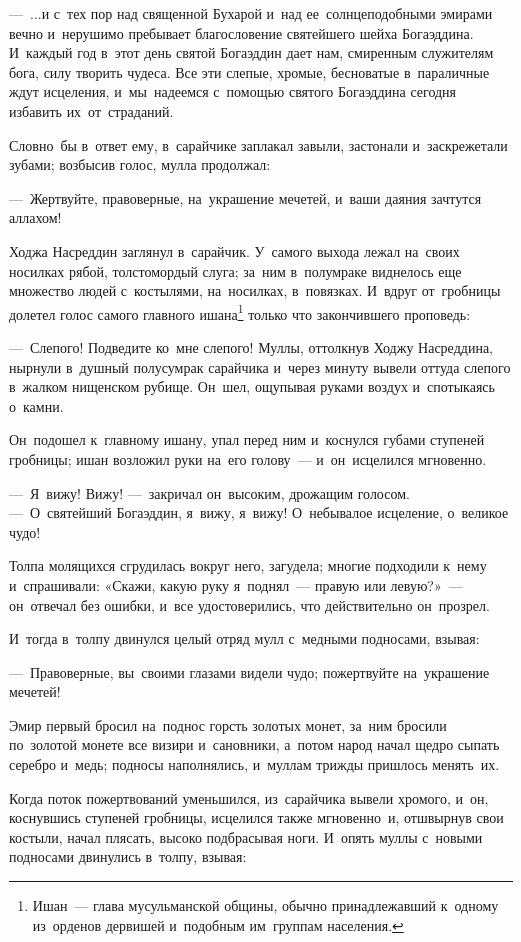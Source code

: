 \documentclass[12pt,a4paper]{book}
\begin{document}
—~...и с~тех пор над священной Бухарой и~над ее~солнцеподобными эмирами вечно и~нерушимо пребывает благословение святейшего шейха Богаэддина. И~каждый год в~этот день святой Богаэддин дает нам, смиренным служителям бога, силу творить чудеса. Все эти слепые, хромые, бесноватые в~параличные ждут исцеления, и~мы~надеемся с~помощью святого Богаэддина сегодня избавить их~от~страданий.

Словно~бы в~ответ ему, в~сарайчике заплакал завыли, застонали и~заскрежетали зубами; возбысив голос, мулла продолжал:

—~Жертвуйте, правоверные, на~украшение мечетей, и~ваши даяния зачтутся аллахом!

Ходжа Насреддин заглянул в~сарайчик. У~самого выхода лежал на~своих носилках рябой, толстомордый слуга; за~ним в~полумраке виднелось еще множество людей с~костылями, на~носилках, в~повязках. И~вдруг от~гробницы долетел голос самого главного ишана\footnote{Ишан~— глава мусульманской общины, обычно принадлежавший к~одному из~орденов дервишей и~подобным им~группам населения.} только что закончившего проповедь:

—~Слепого! Подведите ко~мне слепого! Муллы, оттолкнув Ходжу Насреддина, нырнули в~душный полусумрак сарайчика и~через минуту вывели оттуда слепого в~жалком нищенском рубище. Он~шел, ощупывая руками воздух и~спотыкаясь о~камни.

Он~подошел к~главному ишану, упал перед ним и~коснулся губами ступеней гробницы; ишан возложил руки на~его голову~— и~он~исцелился мгновенно.

—~Я~вижу! Вижу! —~закричал он~высоким, дрожащим голосом. —~О~святейший Богаэддин, я~вижу, я~вижу! О~небывалое исцеление, о~великое чудо!

Толпа молящихся сгрудилась вокруг него, загудела; многие подходили к~нему и~спрашивали: «Скажи, какую руку я~поднял~— правую или левую?»~— он~отвечал без ошибки, и~все удостоверились, что действительно он~прозрел.

И~тогда в~толпу двинулся целый отряд мулл с~медными подносами, взывая:

—~Правоверные, вы~своими глазами видели чудо; пожертвуйте на~украшение мечетей!

Эмир первый бросил на~поднос горсть золотых монет, за~ним бросили по~золотой монете все визири и~сановники, а~потом народ начал щедро сыпать серебро и~медь; подносы наполнялись, и~муллам трижды пришлось менять~их.

Когда поток пожертвований уменьшился, из~сарайчика вывели хромого, и~он, коснувшись ступеней гробницы, исцелился также мгновенно~и, отшвырнув свои костыли, начал плясать, высоко подбрасывая ноги. И~опять муллы с~новыми подносами двинулись в~толпу, взывая:
\end{document}
